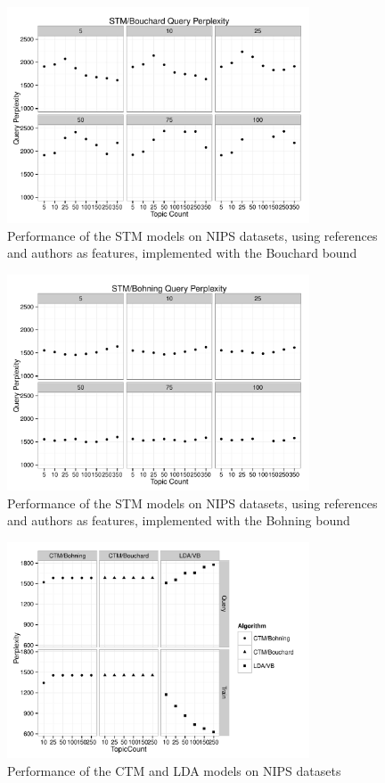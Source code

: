 \begin{figure}
\centering
    \includegraphics[width=0.8\textwidth]{plots/nips-stm-bou-kp.pdf}
    \caption{Performance of the STM models on NIPS datasets, using references and authors as features, implemented with the Bouchard bound}
    \label{fig:nips-stm-bou-p-all}
\end{figure}

\begin{figure}
\centering
    \includegraphics[width=0.8\textwidth]{plots/nips-stm-boh-kp.pdf}
    \caption{Performance of the STM models on NIPS datasets, using references and authors as features, implemented with the Bohning bound}
    \label{fig:nips-stm-boh-p-all}
\end{figure}

\begin{figure}
\centering
    \includegraphics[width=0.8\textwidth]{plots/nips-lda-ctm.pdf}
    \caption{Performance of the CTM and LDA models on NIPS datasets}
    \label{fig:nips-lda-ctm}
\end{figure}



